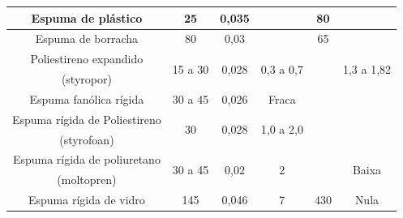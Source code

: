 \documentclass[c]{beamer}
\begin{document}
{\begin{frame}
\begin{table}[c]
\begin{center}
{\begin{tabular}{c|c|c|c|c|c}
						Espuma de plástico                                       &25                                  &0,035                                            &                                    &80                                      &\\ \hline
						Espuma de borracha                                       &80                                  &0,03                                             &                                    &65                                      &\\ \hline
						Poliestireno expandido                                   &\multirow{2}{*}{15 a 30}            &\multirow{2}{*}{0,028}                           &\multirow{2}{*}{0,3 a 0,7}          &                                        &\multirow{2}{*}{1,3 a 1,82}\\
						(styropor)                                               &                                    &                                                 &                                    &                                        &\\ \hline 
						Espuma fanólica rígida                                   &30 a 45                             &0,026                                            &Fraca                               &                                        &\\ \hline
						Espuma rígida de Poliestireno                            &\multirow{2}{*}{30}                 &\multirow{2}{*}{0,028}                           &\multirow{2}{*}{1,0 a 2,0}          &                                        &\\
						(styrofoan)                                              &                                    &                                                 &                                    &                                        &\\ \hline
						Espuma rígida de poliuretano                             &\multirow{2}{*}{30 a 45}            &\multirow{2}{*}{0,02}                            &\multirow{2}{*}{2}                  &                                        &\multirow{2}{*}{Baixa}\\
						(moltopren)                                              &                                    &                                                 &                                    &                                        &\\ \hline
						Espuma rígida de vidro                                   &\multirow{2}{*}{145}                &\multirow{2}{*}{0,046}                           &\multirow{2}{*}{7}                  &\multirow{2}{*}{430}                    &\multirow{2}{*}{Nula}\\

\end{tabular}}
\end{center}
\end{table}
\end{frame}}
\end{document}
